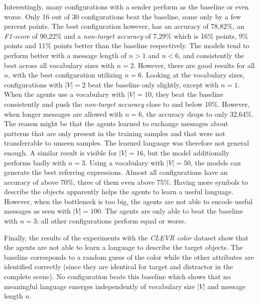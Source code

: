 Interestingly, many configurations with a sender perform as the baseline or even worse.
Only 16 out of 30 configurations beat the baseline, some only by a few percent points.
The best configuration however, has an accuracy of 78,82\%, an \emph{F1-score} of 90,22\% and a \emph{non-target accuracy} of 7,29\% which is 16\% points, 9\% points and 11\% points better than the baseline respectively.
The models tend to perform better with a message length of $n>1$ and $n<6$, and consistently the best across all vocabulary sizes with $n=2$.
However, there are good results for all $n$, with the best configuration utilizing $n=6$.
Looking at the vocabulary sizes, configurations with $|V|=2$ beat the baseline only slightly, except with $n=1$.
When the agents use a vocabulary with $|V|=10$, they beat the baseline consistently and push the \emph{non-target accuracy} close to and below 10\%.
However, when longer messages are allowed with $n=6$, the accuracy drops to only 32,64\%.
The reason might be that the agents learned to exchange messages about patterns that are only present in the training samples and that were not transferrable to unseen samples.
The learned language was therefore not general enough.
A similar result is visible for $|V|=16$, but the model additionally performs badly with $n=3$.
Using a vocabulary with $|V|=50$, the models can generate the best referring expressions.
Almost all configurations have an accuracy of above 70\%, three of them even above 75\%.
Having more symbols to describe the objects apparently helps the agents to learn a useful language.
However, when the bottleneck is too big, the agents are not able to encode useful messages as seen with $|V|=100$.
The agents are only able to beat the baseline with $n=3$; all other configurations perform equal or worse.

Finally, the results of the experiments with the \emph{CLEVR color} dataset show that the agents are not able to learn a language to describe the target objects.
The baseline corresponds to a random guess of the color while the other attributes are identified correctly (since they are identical for target and distractor in the complete scene).
No configuration beats this baseline which shows that no meaningful language emerges independently of vocabulary size $|V|$ and message length $n$.

